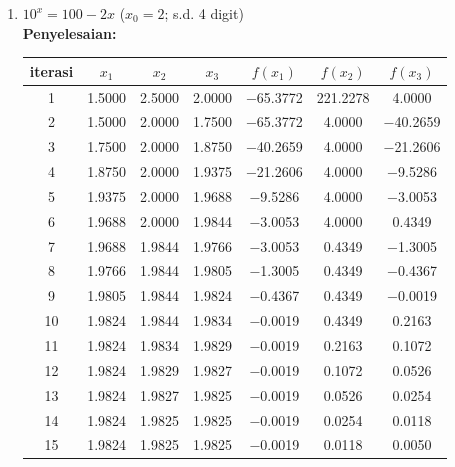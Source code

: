 \documentclass{article}
\newcommand{\penyelesaian}{\textbf{Penyelesaian: }}
\begin{document}
\begin{enumerate}
\begin{enumerate}
        \item $10^x = 100 - 2x$ ($x_0 = \num{2}$; s.d. 4 digit) \\
        \penyelesaian \\         
        \begin{tabular}{|c|c|c|c|c|c|c|}
            \hline
            iterasi & $x_1$ & $x_2$ & $x_3$ & $f(x_1)$ & $f(x_2)$ & $f(x_3)$ \\
            \hline
            1 & \num{1,5000} & \num{2,5000} & \num{2,0000} & \num{-65,3772} & \num{221,2278} & \num{4,0000}\\
            2 & \num{1,5000} & \num{2,0000} & \num{1,7500} & \num{-65,3772} & \num{4,0000} & \num{-40,2659}\\
            3 & \num{1,7500} & \num{2,0000} & \num{1,8750} & \num{-40,2659} & \num{4,0000} & \num{-21,2606}\\
            4 & \num{1,8750} & \num{2,0000} & \num{1,9375} & \num{-21,2606} & \num{4,0000} & \num{-9,5286}\\
            5 & \num{1,9375} & \num{2,0000} & \num{1,9688} & \num{-9,5286} & \num{4,0000} & \num{-3,0053}\\
            6 & \num{1,9688} & \num{2,0000} & \num{1,9844} & \num{-3,0053} & \num{4,0000} & \num{0,4349}\\
            7 & \num{1,9688} & \num{1,9844} & \num{1,9766} & \num{-3,0053} & \num{0,4349} & \num{-1,3005}\\
            8 & \num{1,9766} & \num{1,9844} & \num{1,9805} & \num{-1,3005} & \num{0,4349} & \num{-0,4367}\\
            9 & \num{1,9805} & \num{1,9844} & \num{1,9824} & \num{-0,4367} & \num{0,4349} & \num{-0,0019}\\
            10 & \num{1,9824} & \num{1,9844} & \num{1,9834} & \num{-0,0019} & \num{0,4349} & \num{0,2163}\\
            11 & \num{1,9824} & \num{1,9834} & \num{1,9829} & \num{-0,0019} & \num{0,2163} & \num{0,1072}\\
            12 & \num{1,9824} & \num{1,9829} & \num{1,9827} & \num{-0,0019} & \num{0,1072} & \num{0,0526}\\
            13 & \num{1,9824} & \num{1,9827} & \num{1,9825} & \num{-0,0019} & \num{0,0526} & \num{0,0254}\\
            14 & \num{1,9824} & \num{1,9825} & \num{1,9825} & \num{-0,0019} & \num{0,0254} & \num{0,0118}\\
            15 & \num{1,9824} & \num{1,9825} & \num{1,9825} & \num{-0,0019} & \num{0,0118} & \num{0,0050}\\

\end{tabular}
\end{enumerate}
\end{enumerate}
\end{document}
